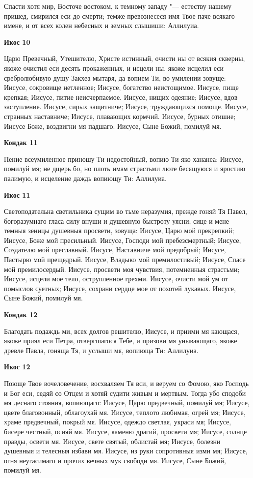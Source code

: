 Спасти
хотя мир, Восточе востоком, к темному западу "--- естеству нашему пришед, смирился еси до смерти; темже превознесеся имя Твое паче всякаго имене, и от всех колен небесных и земных слышиши: Аллилуиа.


\medskip
\bfseries Икос 10\normalfont{}


Царю
Превечный, Утешителю, Христе истинный, очисти ны от всякия скверны, якоже очистил еси десять прокаженных, и исцели ны, якоже исцелил еси сребролюбивую душу Закхеа мытаря, да вопием Ти, во умилении зовуще: Иисусе, сокровище нетленное; Иисусе, богатство неистощимое. Иисусе, пище крепкая; Иисусе, питие неисчерпаемое. Иисусе, нищих одеяние; Иисусе, вдов заступление. Иисусе, сирых защитниче; Иисусе, труждающихся помоще. Иисусе, странных наставниче; Иисусе, плавающих кормчий. Иисусе, бурных отишие; Иисусе Боже, воздвигни мя падшаго. Иисусе, Сыне Божий, помилуй мя.


\medskip
\bfseries Кондак 11\normalfont{}


Пение
всеумиленное приношу Ти недостойный, вопию Ти яко хананеа: Иисусе, помилуй мя; не дщерь бо, но плоть имам страстьми люте бесящуюся и яростию палимую, и исцеление даждь вопиющу Ти: Аллилуиа.


\medskip
\bfseries Икос 11\normalfont{}


Светоподательна
светильника сущим во тьме неразумия, прежде гоняй Тя Павел, богоразумнаго гласа силу внуши и душевную быстроту уясни; сице и мене темныя зеницы душевныя просвети, зовуща: Иисусе, Царю мой прекрепкий; Иисусе, Боже мой пресильный. Иисусе, Господи мой пребезсмертный; Иисусе, Создателю мой преславный. Иисусе, Наставниче мой предобрый; Иисусе, Пастырю мой прещедрый. Иисусе, Владыко мой премилостивый; Иисусе, Спасе мой премилосердый. Иисусе, просвети моя чувствия, потемненныя страстьми; Иисусе, исцели мое тело, острупленное грехми. Иисусе, очисти мой ум от помыслов суетных; Иисусе, сохрани сердце мое от похотей лукавых. Иисусе, Сыне Божий, помилуй мя.


\medskip
\bfseries Кондак 12\normalfont{}


Благодать
подаждь ми, всех долгов решителю, Иисусе, и приими мя кающася, якоже приял еси Петра, отвергшагося Тебе, и призови мя унывающаго, якоже древле Павла, гоняща Тя, и услыши мя, вопиюща Ти: Аллилуиа.


\medskip
\bfseries Икос 12\normalfont{}


Поюще
Твое вочеловечение, восхваляем Тя вси, и веруем со Фомою, яко Господь и Бог еси, седяй со Отцем и хотяй судити живым и мертвым. Тогда убо сподоби мя деснаго стояния, вопиющаго: Иисусе, Царю предвечный, помилуй мя; Иисусе, цвете благовонный, облагоухай мя. Иисусе, теплото любимая, огрей мя; Иисусе, храме предвечный, покрый мя. Иисусе, одеждо светлая, украси мя; Иисусе, бисере честный, осияй мя. Иисусе, каменю драгий, просвети мя; Иисусе, солнце правды, освети мя. Иисусе, свете святый, облистай мя; Иисусе, болезни душевныя и телесныя избави мя. Иисусе, из руки сопротивныя изми мя; Иисусе, огня неугасимаго и прочих вечных мук свободи мя. Иисусе, Сыне Божий, помилуй мя. 


